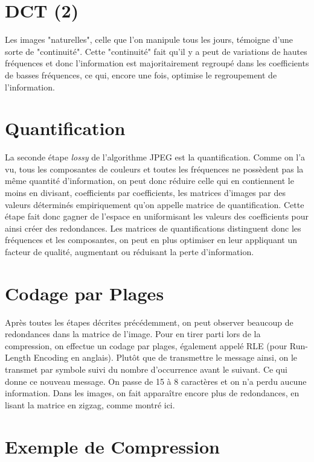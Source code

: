 \documentclass{article}
\begin{document}
\section{DCT (2)}

Les images "naturelles", celle que l'on manipule tous les jours, témoigne d'une sorte de "continuité".
Cette "continuité" fait qu'il y a peut de variations de hautes fréquences et donc l'information est majoritairement regroupé dans
les coefficients de basses fréquences, ce qui, encore une fois, optimise le regroupement de l'information.

\section{Quantification}

La seconde étape \textit{lossy} de l'algorithme JPEG est la quantification. Comme on l'a vu, tous les composantes de couleurs et
toutes les fréquences ne possèdent pas la même quantité d'information, on peut donc réduire celle qui en contiennent le moins en divisant, 
coefficients par coefficients, les matrices d'images par des valeurs déterminés empiriquement qu'on appelle matrice de quantification. Cette
étape fait donc gagner de l'espace en uniformisant les valeurs des coefficients pour ainsi créer des redondances. Les matrices de quantifications
distinguent donc les fréquences et les composantes, on peut en plus optimiser en leur appliquant un facteur de qualité, augmentant ou réduisant
la perte d'information. 

\section{Codage par Plages}

Après toutes les étapes décrites précédemment, on peut observer beaucoup de redondances dans la matrice de l'image. Pour en tirer parti lors de 
la compression, on effectue un codage par plages, également appelé RLE (pour Run-Length Encoding en anglais). Plutôt que de transmettre le message 
ainsi, on le transmet par symbole suivi du nombre d’occurrence avant le suivant. Ce qui donne ce nouveau message.
On passe de 15 à 8 caractères et on n'a perdu aucune information. Dans les images, on fait apparaître encore plus de redondances, en lisant la
matrice en zigzag, comme montré ici. 

\section{Exemple de Compression}
\end{document}
